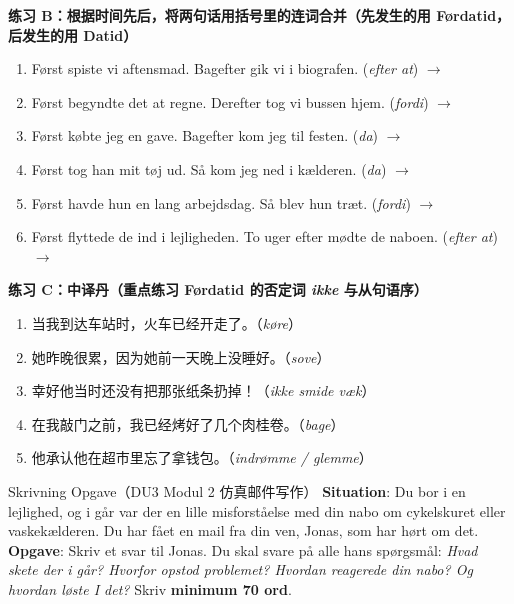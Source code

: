 \textbf{练习 B：根据时间先后，将两句话用括号里的连词合并（先发生的用 Førdatid，后发生的用 Datid）}
\begin{enumerate}
  \item Først spiste vi aftensmad. Bagefter gik vi i biografen. (\textit{efter at}) $\rightarrow$
  \item Først begyndte det at regne. Derefter tog vi bussen hjem. (\textit{fordi}) $\rightarrow$
  \item Først købte jeg en gave. Bagefter kom jeg til festen. (\textit{da}) $\rightarrow$
  \item Først tog han mit tøj ud. Så kom jeg ned i kælderen. (\textit{da}) $\rightarrow$
  \item Først havde hun en lang arbejdsdag. Så blev hun træt. (\textit{fordi}) $\rightarrow$
  \item Først flyttede de ind i lejligheden. To uger efter mødte de naboen. (\textit{efter at}) $\rightarrow$
\end{enumerate}

\textbf{练习 C：中译丹（重点练习 Førdatid 的否定词 \textit{ikke} 与从句语序）}
\begin{enumerate}
  \item 当我到达车站时，火车已经开走了。（\textit{køre}）
  \item 她昨晚很累，因为她前一天晚上没睡好。（\textit{sove}）
  \item 幸好他当时还没有把那张纸条扔掉！（\textit{ikke smide væk}）
  \item 在我敲门之前，我已经烤好了几个肉桂卷。（\textit{bage}）
  \item 他承认他在超市里忘了拿钱包。（\textit{indrømme / glemme}）
\end{enumerate}


\begin{emailbox}{Skrivning Opgave（DU3 Modul 2 仿真邮件写作）}
\textbf{Situation}: Du bor i en lejlighed, og i går var der en lille misforståelse med din nabo om cykelskuret eller vaskekælderen. Du har fået en mail fra din ven, Jonas, som har hørt om det.\\
\textbf{Opgave}: Skriv et svar til Jonas. Du skal svare på alle hans spørgsmål: \textit{Hvad skete der i går? Hvorfor opstod problemet? Hvordan reagerede din nabo? Og hvordan løste I det?} Skriv \textbf{minimum 70 ord}.
\end{emailbox}

